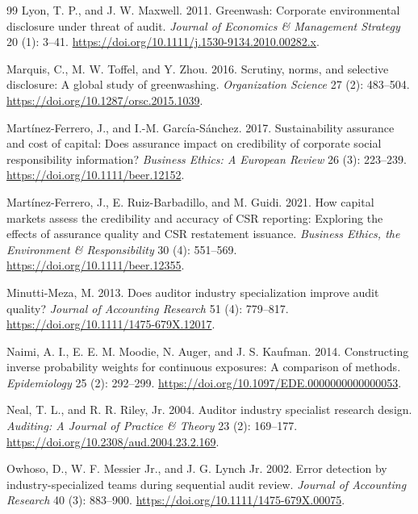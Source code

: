 \documentclass[11pt]{article}
\begin{document}
\begin{thebibliography}{99}
Lyon, T. P., and J. W. Maxwell. 2011.
Greenwash: Corporate environmental disclosure under threat of audit.
\textit{Journal of Economics \& Management Strategy} 20 (1): 3--41. \url{https://doi.org/10.1111/j.1530-9134.2010.00282.x}.

Marquis, C., M. W. Toffel, and Y. Zhou. 2016.
Scrutiny, norms, and selective disclosure: A global study of greenwashing.
\textit{Organization Science} 27 (2): 483--504. \url{https://doi.org/10.1287/orsc.2015.1039}.

Martínez-Ferrero, J., and I.-M. García-Sánchez. 2017.
Sustainability assurance and cost of capital: Does assurance impact on credibility of corporate social responsibility information?
\textit{Business Ethics: A European Review} 26 (3): 223--239. \url{https://doi.org/10.1111/beer.12152}.

Martínez-Ferrero, J., E. Ruiz-Barbadillo, and M. Guidi. 2021.
How capital markets assess the credibility and accuracy of CSR reporting: Exploring the effects of assurance quality and CSR restatement issuance.
\textit{Business Ethics, the Environment \& Responsibility} 30 (4): 551--569. \url{https://doi.org/10.1111/beer.12355}.

Minutti-Meza, M. 2013.
Does auditor industry specialization improve audit quality?
\textit{Journal of Accounting Research} 51 (4): 779--817. \url{https://doi.org/10.1111/1475-679X.12017}.

Naimi, A. I., E. E. M. Moodie, N. Auger, and J. S. Kaufman. 2014.
Constructing inverse probability weights for continuous exposures: A comparison of methods.
\textit{Epidemiology} 25 (2): 292--299. \url{https://doi.org/10.1097/EDE.0000000000000053}.

Neal, T. L., and R. R. Riley, Jr. 2004.
Auditor industry specialist research design.
\textit{Auditing: A Journal of Practice \& Theory} 23 (2): 169--177. \url{https://doi.org/10.2308/aud.2004.23.2.169}.

Owhoso, D., W. F. Messier Jr., and J. G. Lynch Jr. 2002.
Error detection by industry-specialized teams during sequential audit review.
\textit{Journal of Accounting Research} 40 (3): 883--900. \url{https://doi.org/10.1111/1475-679X.00075}.


\end{thebibliography}
\end{document}
